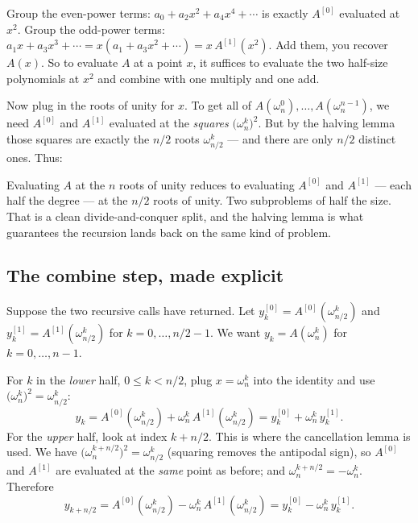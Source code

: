 \begin{intuitionbox}
Group the even-power terms: $a_0 + a_2x^2 + a_4x^4 +\cdots$
is exactly $A^{[0]}$ evaluated at $x^2$. Group the odd-power terms:
$a_1x + a_3x^3+\cdots = x(a_1 + a_3 x^2 + \cdots) = x\,A^{[1]}(x^2)$. Add them, you
recover $A(x)$. So to evaluate $A$ at a point $x$, it suffices to evaluate the two
half-size polynomials at $x^2$ and combine with one multiply and one add.
\end{intuitionbox}

Now plug in the roots of unity for $x$. To get all of $A(\omega_n^0),\dots,
A(\omega_n^{n-1})$, we need $A^{[0]}$ and $A^{[1]}$ evaluated at the \emph{squares}
$\big(\omega_n^k\big)^2$. But by the halving lemma those squares are exactly the
$n/2$ roots $\omega_{n/2}^{k}$ --- and there are only $n/2$ distinct ones. Thus:

\begin{focusbox}
Evaluating $A$ at the $n$ roots of unity reduces to evaluating $A^{[0]}$ and
$A^{[1]}$ --- each half the degree --- at the $n/2$ roots of unity. Two
subproblems of half the size. That is a clean divide-and-conquer split, and the
halving lemma is what guarantees the recursion lands back on the same kind of
problem.
\end{focusbox}

\subsection{The combine step, made explicit}

Suppose the two recursive calls have returned. Let
$y^{[0]}_k = A^{[0]}(\omega_{n/2}^{k})$ and $y^{[1]}_k = A^{[1]}(\omega_{n/2}^{k})$
for $k=0,\dots,n/2-1$. We want $y_k = A(\omega_n^k)$ for $k = 0,\dots,n-1$.

For $k$ in the \emph{lower} half, $0 \le k < n/2$, plug $x=\omega_n^k$ into the
identity and use $\big(\omega_n^k\big)^2 = \omega_{n/2}^k$:
\[
y_k = A^{[0]}(\omega_{n/2}^k) + \omega_n^k\, A^{[1]}(\omega_{n/2}^k)
    = y^{[0]}_k + \omega_n^k\, y^{[1]}_k.
\]
For the \emph{upper} half, look at index $k+n/2$. This is where the cancellation
lemma is used. We have $\big(\omega_n^{k+n/2}\big)^2 = \omega_{n/2}^{k}$ (squaring
removes the antipodal sign), so $A^{[0]}$ and $A^{[1]}$ are evaluated at the
\emph{same} point as before; and $\omega_n^{k+n/2} = -\omega_n^k$. Therefore
\[
y_{k+n/2} = A^{[0]}(\omega_{n/2}^k) - \omega_n^k\, A^{[1]}(\omega_{n/2}^k)
          = y^{[0]}_k - \omega_n^k\, y^{[1]}_k.
\]

